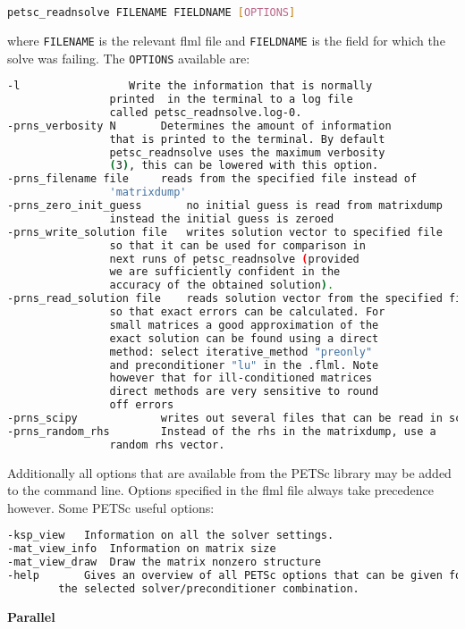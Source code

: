 \begin{lstlisting}[language = Bash]
petsc_readnsolve FILENAME FIELDNAME [OPTIONS]
\end{lstlisting}
where \lstinline[language = Bash]+FILENAME+ is the relevant flml file and \lstinline[language = Bash]+FIELDNAME+ is the field for which the solve was failing. The \lstinline[language = Bash]+OPTIONS+ available are:
\begin{lstlisting}[language = Bash]
 -l 	 			Write the information that is normally
				printed  in the terminal to a log file
				called petsc_readnsolve.log-0.
-prns_verbosity N 	 	Determines the amount of information
				that is printed to the terminal. By default
				petsc_readnsolve uses the maximum verbosity
				(3), this can be lowered with this option.
-prns_filename file		reads from the specified file instead of
				'matrixdump'
-prns_zero_init_guess 		no initial guess is read from matrixdump
				instead the initial guess is zeroed
-prns_write_solution file 	writes solution vector to specified file
				so that it can be used for comparison in
				next runs of petsc_readnsolve (provided
				we are sufficiently confident in the
				accuracy of the obtained solution).
-prns_read_solution file 	reads solution vector from the specified file,
				so that exact errors can be calculated. For
				small matrices a good approximation of the
				exact solution can be found using a direct
				method: select iterative_method "preonly"
				and preconditioner "lu" in the .flml. Note
				however that for ill-conditioned matrices
				direct methods are very sensitive to round
				off errors
-prns_scipy 			writes out several files that can be read in scipy.
-prns_random_rhs 	 	Instead of the rhs in the matrixdump, use a
				random rhs vector.
\end{lstlisting}

Additionally all options that are available from the PETSc library may be added to the command line. Options specified in the flml file always take precedence however. Some PETSc useful options:

\begin{lstlisting}[language = Bash]
-ksp_view 	Information on all the solver settings.
-mat_view_info 	Information on matrix size
-mat_view_draw 	Draw the matrix nonzero structure
-help 		Gives an overview of all PETSc options that can be given for
		the selected solver/preconditioner combination.
\end{lstlisting}

{\bf Parallel}


